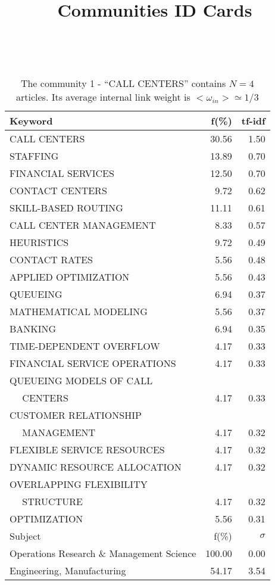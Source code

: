 \documentclass[a4paper,11pt]{report}
\title{{\bf Communities ID Cards}}
\date{\begin{flushleft}This document gather the ``ID Cards'' of the CC communities found within your database.\\
 The CC network was built by keeping a link between articles sharing at least 5 references. The communities characterized here correspond to the ones found in the level 1 (in the sense of the Louvain algo) which gathers more than 0 articles.\\
 These ID cards displays the most frequent keywords, subject categories, journals of publication, institution, countries, authors, references and reference journals of the articles of each community. The significance of an item $\sigma = \sqrt{N} (f - p) / \sqrt{p(1-p)}$ [where $N$ is the number of articles within the community and $f$ and $p$ are the proportion of articles respectively within the community and within the database displaying that item ] is also given (for example $\sigma > 5$ is really highly significant). The tf-idf value which can be calculated by $tf-idf = f*log(frac{1}{p})$ is also given.\\
\vspace{1cm}
\copyright Sebastian Grauwin, Liu Weizhi - (2014) \end{flushleft}}
\begin{document}
\begin{landscape}
\maketitle
\clearpage

\begin{table}[!ht]
\caption{The community 1 - ``CALL CENTERS'' contains $N = 4$ articles. Its average internal link weight is $<\omega_{in}> \simeq 1/3$ }
\textcolor{white}{aa}\\
{\scriptsize\begin{tabular}{|l r  r|}
\hline
Keyword & f(\%) & tf-idf \\
\hline
CALL CENTERS & 30.56 & 1.50\\
STAFFING & 13.89 & 0.70\\
FINANCIAL SERVICES & 12.50 & 0.70\\
CONTACT CENTERS & 9.72 & 0.62\\
SKILL-BASED ROUTING & 11.11 & 0.61\\
CALL CENTER MANAGEMENT & 8.33 & 0.57\\
HEURISTICS & 9.72 & 0.49\\
CONTACT RATES & 5.56 & 0.48\\
APPLIED OPTIMIZATION & 5.56 & 0.43\\
QUEUEING & 6.94 & 0.37\\
MATHEMATICAL MODELING & 5.56 & 0.37\\
BANKING & 6.94 & 0.35\\
TIME-DEPENDENT OVERFLOW & 4.17 & 0.33\\
FINANCIAL SERVICE OPERATIONS & 4.17 & 0.33\\
QUEUEING MODELS OF CALL &  &\\
$\quad$ CENTERS & 4.17 & 0.33\\
CUSTOMER RELATIONSHIP &  &\\
$\quad$ MANAGEMENT & 4.17 & 0.32\\
FLEXIBLE SERVICE RESOURCES & 4.17 & 0.32\\
DYNAMIC RESOURCE ALLOCATION & 4.17 & 0.32\\
OVERLAPPING FLEXIBILITY &  &\\
$\quad$ STRUCTURE & 4.17 & 0.32\\
OPTIMIZATION & 5.56 & 0.31\\
\hline
\hline
Subject & f(\%) & $\sigma$\\
\hline
Operations Research \& Management Science & 100.00 & 0.00\\
Engineering, Manufacturing & 54.17 & 3.54\\

\end{tabular}}
\end{table}
\end{landscape}
\end{document}

